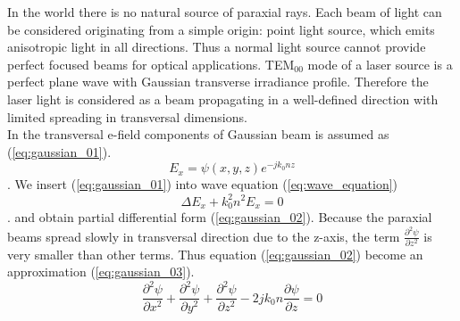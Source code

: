 In the world there is no natural source of paraxial rays. Each beam of light can be considered originating from a simple origin: point light source, which emits anisotropic light in all directions. Thus a normal light source cannot provide perfect focused beams for optical applications. TEM$_{00}$ mode of a laser source is a perfect plane wave with Gaussian transverse irradiance profile\cite{CVI_Melles_Griot_Technical_Guide}. Therefore the laser light is considered as a beam propagating in a well-defined direction with limited spreading in transversal dimensions.\\ 

In \cite{ script_FT_TET} the transversal e-field components of Gaussian beam is assumed as (\ref{eq:gaussian_01}).
\begin{equation}
E_{x}=\psi(x,y,z)e^{-jk_{0}nz}
\label{eq:gaussian_01}
\end{equation}.
We insert (\ref{eq:gaussian_01}) into wave equation (\ref{eq:wave_equation})
\begin{equation}
\Delta E_{x}+k^{2}_{0}n^{2}E_{x}=0
\label{eq:wave_equation}
\end{equation}.
 and obtain partial differential form (\ref{eq:gaussian_02}). Because the paraxial beams spread slowly in transversal direction due to the z-axis, the term $\frac{\partial ^{2}\psi}{\partial z^2}$ is very smaller than other terms. Thus equation (\ref{eq:gaussian_02}) become an approximation (\ref{eq:gaussian_03}).
\begin{equation}
\frac{\partial ^{2}\psi}{\partial x^2}+\frac{\partial ^{2}\psi}{\partial y^2}+\frac{ \partial ^{2}\psi}{\partial z^2}-2jk_{0}n\frac{\partial\psi}{\partial z}=0
\label{eq:gaussian_02}
\end{equation}

